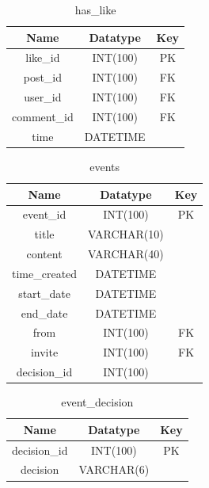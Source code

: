 \begin{table}[!ht]
\caption{has\_like}
\centering
\begin{tabular}{c c c}
\hline\hline
Name               & Datatype    & Key \\
\hline
like\_id           & INT(100)     & PK  \\
post\_id           & INT(100)     & FK  \\
user\_id           & INT(100)     & FK  \\
comment\_id        & INT(100)     & FK  \\
time               & DATETIME     &     \\
\hline
\end{tabular}
\label{table:nonlin}
\end{table}

\begin{table}[!ht]
\caption{events}
\centering
\begin{tabular}{c c c}
\hline\hline
Name                    & Datatype    & Key \\
\hline
event\_id               & INT(100)     & PK  \\
title                   & VARCHAR(10)  &     \\
content                 & VARCHAR(40)  &     \\
time\_created           & DATETIME     & \\
start\_date              & DATETIME     & \\
end\_date                & DATETIME     & \\
from                    & INT(100)     & FK  \\
invite                  & INT(100)     & FK  \\
decision\_id            & INT(100)     & \\
\hline
\end{tabular}
\label{table:nonlin}
\end{table}

\begin{table}[!ht]
\caption{event\_decision}
\centering
\begin{tabular}{c c c}
\hline\hline
Name                    & Datatype    & Key \\
\hline
decision\_id            & INT(100)    & PK  \\
decision                & VARCHAR(6)  &     \\
\hline
\end{tabular}
\label{table:nonlin}
\end{table}

